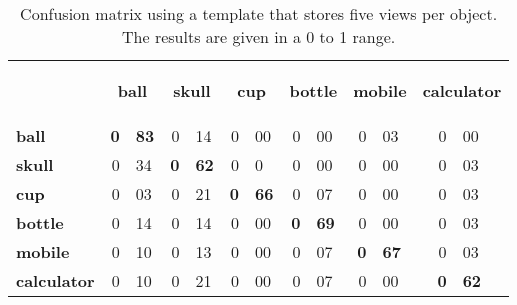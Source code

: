 
\begin{table}[H]
\centering
\begin{tabular} {l r@{.}l r@{.}l r@{.}l r@{.}l r@{.}l r@{.}l }
\toprule
\addlinespace[3mm]
   \multicolumn{1}{c}{\begin{center}\textbf{Real} \mid \textbf{Predicted}\end{center}} &
   \multicolumn{2}{c}{\begin{flushright}\textbf{ball}\end{flushright}} &
   \multicolumn{2}{c}{\begin{flushright}\textbf{skull}\end{flushright}} &
   \multicolumn{2}{c}{\begin{flushright}\textbf{cup}\end{flushright}} &
   \multicolumn{2}{c}{\begin{flushright}\textbf{bottle}\end{flushright}} &
   \multicolumn{2}{c}{\begin{flushright}\textbf{mobile}\end{flushright}} &
   \multicolumn{2}{c}{\begin{flushright}\textbf{calculator}\end{flushright}} &\\

\addlinespace[-3mm]

\midrule
\textbf{ball}		&	\textbf{0}&\textbf{83}	&	0&14	&	0&00	&	0&00	&	0&03	&	0&00	\\
\textbf{skull}		&	0&34	&	\textbf{0}&\textbf{62}	&	0&0	&	0&00	&	0&00	&	0&03	\\
\textbf{cup}		&	0&03	&	0&21	&	\textbf{0}&\textbf{66}	&	0&07	&	0&00	&	0&03	\\
\textbf{bottle}		&	0&14	&	0&14	&	0&00	&	\textbf{0}&\textbf{69}	&	0&00	&	0&03	\\
\textbf{mobile}		&	0&10	&	0&13	&	0&00	&	0&07	&	\textbf{0}&\textbf{67}	&	0&03	\\
\textbf{calculator}	&	0&10	&	0&21	&	0&00	&	0&07	&	0&00	&	\textbf{0}&\textbf{62}	\\


\bottomrule
\end{tabular}
\caption[Confusion matrix - templates using 5 views]{Confusion matrix using a template that stores five views per object. The results are given in a 0 to 1 range. }
\label{5views_matrix}
\end{table}

